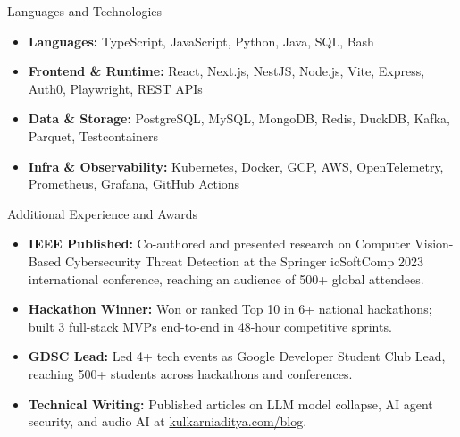\documentclass[]{mcdowellcv}
\begin{document}
\begin{cvsection}{Languages and Technologies}
  \begin{cvsubsection}{}{}{}
    \begin{itemize}
      \item \textbf{Languages:} TypeScript, JavaScript, Python, Java, SQL, Bash
      \item \textbf{Frontend \& Runtime:} React, Next.js, NestJS, Node.js, Vite, Express, Auth0, Playwright, REST APIs
      \item \textbf{Data \& Storage:} PostgreSQL, MySQL, MongoDB, Redis, DuckDB, Kafka, Parquet, Testcontainers
      \item \textbf{Infra \& Observability:} Kubernetes, Docker, GCP, AWS, OpenTelemetry, Prometheus, Grafana, GitHub Actions
    \end{itemize}
  \end{cvsubsection}
\end{cvsection}

\begin{cvsection}{Additional Experience and Awards}
  \begin{cvsubsection}{}{}{}
    \begin{itemize}
      \item \textbf{IEEE Published:} Co-authored and presented research on Computer Vision-Based Cybersecurity Threat Detection at the Springer icSoftComp 2023 international conference, reaching an audience of 500+ global attendees.
      \item \textbf{Hackathon Winner:} Won or ranked Top 10 in 6+ national hackathons; built 3 full-stack MVPs end-to-end in 48-hour competitive sprints.
      \item \textbf{GDSC Lead:} Led 4+ tech events as Google Developer Student Club Lead, reaching 500+ students across hackathons and conferences.
      \item \textbf{Technical Writing:} Published articles on LLM model collapse, AI agent security, and audio AI at \href{https://www.kulkarniaditya.com/blog}{kulkarniaditya.com/blog}.
    \end{itemize}
  \end{cvsubsection}
\end{cvsection}
\end{document}
